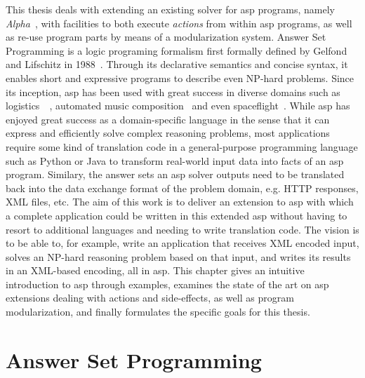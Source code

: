 This thesis deals with extending an existing solver for \gls{asp} programs, namely \emph{Alpha}~\cite{alpha}, with facilities to both execute \emph{actions} from within \gls{asp} programs, as well as re-use program parts by means of a modularization system. Answer Set Programming is a logic programing formalism first formally defined by Gelfond and Lifschitz in 1988~\cite{stable-models}. Through its declarative semantics and concise syntax, it enables short and expressive programs to describe even NP-hard problems. Since its inception, \gls{asp} has been used with great success in diverse domains such as logistics~\cite{gioia-tauro}~\cite{train-scheduling}, automated music composition~\cite{blues-composition} and even spaceflight~\cite{space-shuttle}. While \gls{asp} has enjoyed great success as a domain-specific language in the sense that it can express and efficiently solve complex reasoning problems, most applications require some kind of translation code in a general-purpose programming language such as Python or Java to transform real-world input data into facts of an \gls{asp} program. Similary, the answer sets an \gls{asp} solver outputs need to be translated back into the data exchange format of the problem domain, e.g. HTTP responses, XML files, etc. The aim of this work is to deliver an extension to \gls{asp} with which a complete application could be written in this extended \gls{asp} without having to resort to additional languages and needing to write translation code. The vision is to be able to, for example, write an application that receives XML encoded input, solves an NP-hard reasoning problem based on that input, and writes its results in an XML-based encoding, all in \gls{asp}. This chapter gives an intuitive introduction to \gls{asp} through examples, examines the state of the art on \gls{asp} extensions dealing with actions and side-effects, as well as program modularization, and finally formulates the specific goals for this thesis.

\section{Answer Set Programming}

